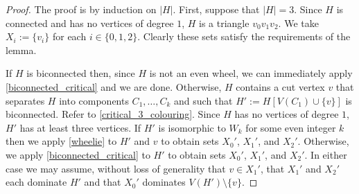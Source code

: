 \documentclass{article}
\theoremstyle{definition}
\begin{document}
\begin{proof}
  The proof is by induction on $|H|$.  First, suppose that $|H|=3$. Since $H$ is connected and has no vertices of degree $1$, $H$ is a triangle $v_0v_1v_2$. We take $X_i:=\{v_i\}$ for each $i\in\{0,1,2\}$.  Clearly these sets satisfy the requirements of the lemma.

  If $H$ is biconnected then, since $H$ is not an even wheel, we can immediately apply \cref{biconnected_critical} and we are done.  Otherwise, $H$ contains a cut vertex $v$ that separates $H$ into components $C_1,\ldots,C_k$ and such that $H':=H[V(C_1)\cup\{v\}]$ is biconnected. Refer to \cref{critical_3_colouring}. Since $H$ has no vertices of degree $1$, $H'$ has at least three vertices. If $H'$ is isomorphic to $W_k$ for some even integer $k$ then we apply \cref{wheelie} to $H'$ and $v$ to obtain sets $X_0'$, $X_1'$, and $X_2'$. Otherwise, we apply \cref{biconnected_critical} to $H'$ to obtain sets $X_0'$, $X_1'$, and $X_2'$.  In either case we may assume, without loss of generality that $v\in X_1'$, that $X_1'$ and $X_2'$ each dominate $H'$ and that $X_0'$ dominates $V(H')\setminus\{v\}$.


\end{proof}
\end{document}
